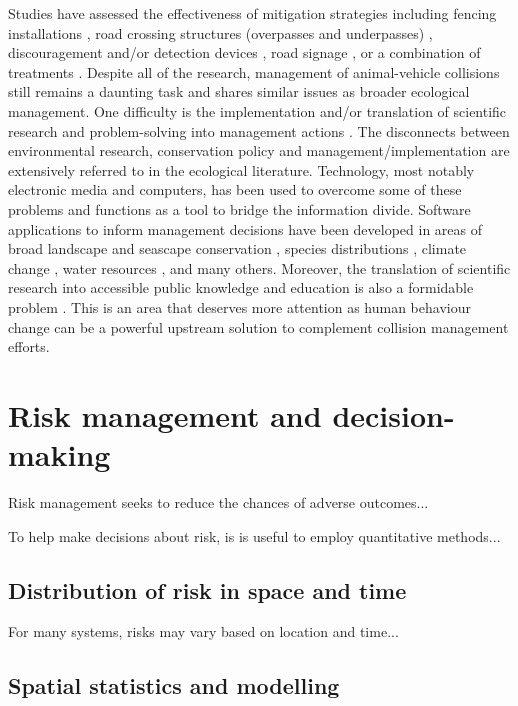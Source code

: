 Studies have assessed the effectiveness of mitigation strategies including fencing installations \citep{clev01,jaeg04}, road crossing structures (overpasses and underpasses) \citep{bond08}, discouragement and/or detection devices \citep{huij03,huij06}, road signage \citep{bond13}, or a combination of treatments \citep{dani98,pola14,romi96}. Despite all of the research, management of animal-vehicle collisions still remains a daunting task and shares similar issues as broader ecological management.  One difficulty is the implementation and/or translation of scientific research and problem-solving into management actions \citep{roux06}.  The disconnects between environmental research, conservation policy and management/implementation are extensively referred to in the ecological literature.  Technology, most notably electronic media and computers, has been used to overcome some of these problems and functions as a tool to bridge the information divide.  Software applications to inform management decisions have been developed in areas of broad landscape and seascape conservation \citep{ball09,watt09}, species distributions \citep{phil06}, climate change \citep{east09}, water resources \citep{liu08}, and many others.  Moreover, the translation of scientific research into accessible public knowledge and education is also a formidable problem \citep{lubc98}.  This is an area that deserves more attention as human behaviour change can be a powerful upstream solution to complement collision management efforts.

\section{Risk management and decision-making}

Risk management seeks to reduce the chances of adverse outcomes...

To help make decisions about risk, is is useful to employ quantitative methods...

\subsection{Distribution of risk in space and time}

For many systems, risks may vary based on location and time...

\subsection{Spatial statistics and modelling}

